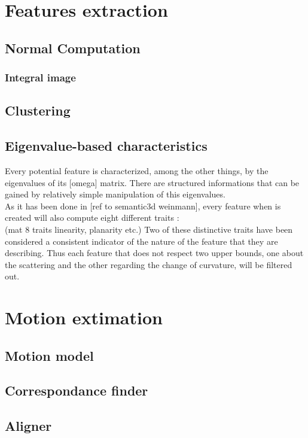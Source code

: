 \documentclass[LaM,binding=0.6cm]{sapthesis}
\begin{document}
\section{Features extraction}

\subsection{Normal Computation}
  \subsubsection{Integral image}

\subsection{Clustering}


\subsection{Eigenvalue-based characteristics}
Every potential feature is characterized, among the other things, by the  eigenvalues  of its [omega] matrix. There are structured informations that can be gained by relatively simple manipulation of this eigenvalues.\\
As it has been done in [ref to semantic3d weinmann], every feature when is created will also compute eight different traits :\\
(mat 8 traits linearity, planarity etc.)
Two of these distinctive traits have been considered a consistent indicator of the nature of the feature that they are describing. Thus each feature that does not respect two upper bounds, one about the scattering and the other regarding the change of curvature, will be filtered out.



\section{Motion extimation}

\subsection{Motion model}
\subsection{Correspondance finder}
\subsection{Aligner}
\end{document}
